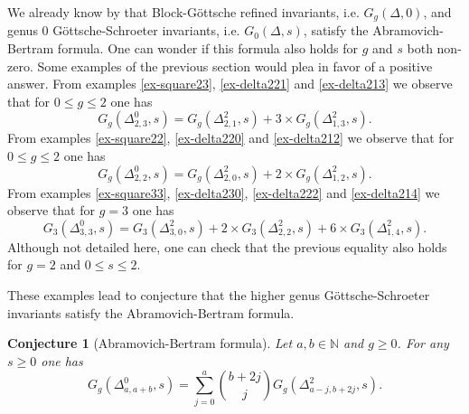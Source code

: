 \documentclass[11pt]{article}
\newtheorem{conj}[theo]{Conjecture}
\theoremstyle{definition}
\numberwithin{equation}{section}
\newcommand{\N}{\mathbb{N}}
\newcommand{\dsum}{\displaystyle\sum}
\theoremstyle{plain}
\begin{document}
We already know by \cite{bousseau_refined_2021} that Block-Göttsche refined invariants, i.e.  $G_g(\Delta,0)$, and genus $0$ Göttsche-Schroeter invariants, i.e.  $G_0(\Delta,s)$, satisfy the Abramovich-Bertram formula. One can wonder if this formula also holds for $g$ and $s$ both non-zero. Some examples of the previous section would plea in favor of a positive answer.
From examples \ref{ex-square23}, \ref{ex-delta221} and \ref{ex-delta213} we observe that for $0\leqslant g\leqslant 2$ one has
\[ G_g(\Delta^0_{2,3},s) = G_g(\Delta^2_{2,1},s) + 3\times G_g(\Delta^2_{1,3},s). \]
From examples \ref{ex-square22}, \ref{ex-delta220} and \ref{ex-delta212} we observe that for $0\leqslant g\leqslant 2$ one has
\[ G_g(\Delta^0_{2,2},s) = G_g(\Delta^2_{2,0},s) + 2\times G_g(\Delta^2_{1,2},s). \]
From examples \ref{ex-square33}, \ref{ex-delta230}, \ref{ex-delta222} and \ref{ex-delta214} we observe that for $g=3$ one has
\[ G_3(\Delta^0_{3,3},s) = G_3(\Delta^2_{3,0},s) + 2\times G_3(\Delta^2_{2,2},s) + 6\times G_3(\Delta^2_{1,4},s). \]
Although not detailed here, one can check that the previous equality also holds for $g=2$ and $0\leqslant s \leqslant 2$.

These examples lead to conjecture that the higher genus Göttsche-Schroeter invariants satisfy the Abramovich-Bertram formula.

\begin{conj}[Abramovich-Bertram formula] \label{conj-AB}
    Let $a,b \in\N$ and $g\geqslant 0$. For any $s\geqslant0$ one has
    \[ G_g(\Delta^0_{a,a+b},s) = \dsum_{j=0}^a \binom{b+2j}{j} G_g(\Delta^2_{a-j,b+2j},s).  \]
\end{conj}
\end{document}
